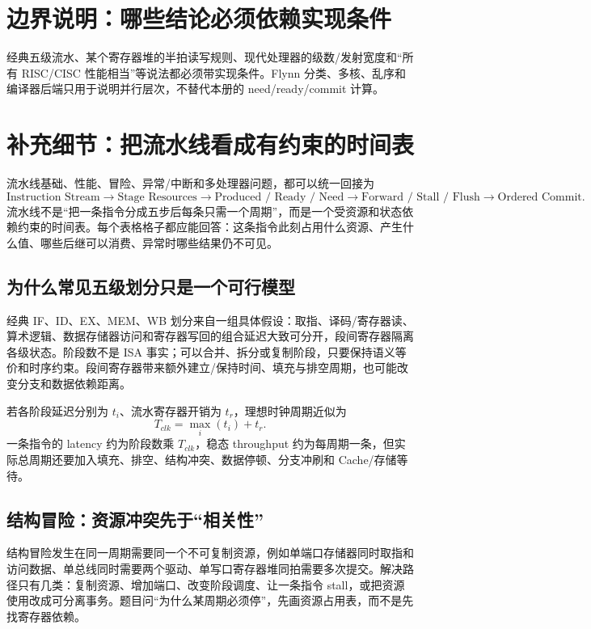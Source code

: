 \documentclass[UTF8,fontset=fandol,11pt,a4paper]{ctexart}
\begin{document}
\section{边界说明：哪些结论必须依赖实现条件}

经典五级流水、某个寄存器堆的半拍读写规则、现代处理器的级数/发射宽度和“所有 RISC/CISC 性能相当”等说法都必须带实现条件。Flynn 分类、多核、乱序和编译器后端只用于说明并行层次，不替代本册的 need/ready/commit 计算。

\section{补充细节：把流水线看成有约束的时间表}

流水线基础、性能、冒险、异常/中断和多处理器问题，都可以统一回接为
\[
\text{Instruction Stream}
\to\text{Stage Resources}
\to\text{Produced / Ready / Need}
\to\text{Forward / Stall / Flush}
\to\text{Ordered Commit}.
\]
流水线不是“把一条指令分成五步后每条只需一个周期”，而是一个受资源和状态依赖约束的时间表。每个表格格子都应能回答：这条指令此刻占用什么资源、产生什么值、哪些后继可以消费、异常时哪些结果仍不可见。

\subsection{为什么常见五级划分只是一个可行模型}

经典 IF、ID、EX、MEM、WB 划分来自一组具体假设：取指、译码/寄存器读、算术逻辑、数据存储器访问和寄存器写回的组合延迟大致可分开，段间寄存器隔离各级状态。阶段数不是 ISA 事实；可以合并、拆分或复制阶段，只要保持语义等价和时序约束。段间寄存器带来额外建立/保持时间、填充与排空周期，也可能改变分支和数据依赖距离。

若各阶段延迟分别为 $t_i$、流水寄存器开销为 $t_r$，理想时钟周期近似为
\[
T_{clk}=\max_i(t_i)+t_r.
\]
一条指令的 latency 约为阶段数乘 $T_{clk}$，稳态 throughput 约为每周期一条，但实际总周期还要加入填充、排空、结构冲突、数据停顿、分支冲刷和 Cache/存储等待。

\subsection{结构冒险：资源冲突先于“相关性”}

结构冒险发生在同一周期需要同一个不可复制资源，例如单端口存储器同时取指和访问数据、单总线同时需要两个驱动、单写口寄存器堆同拍需要多次提交。解决路径只有几类：复制资源、增加端口、改变阶段调度、让一条指令 stall，或把资源使用改成可分离事务。题目问“为什么某周期必须停”，先画资源占用表，而不是先找寄存器依赖。
\end{document}
